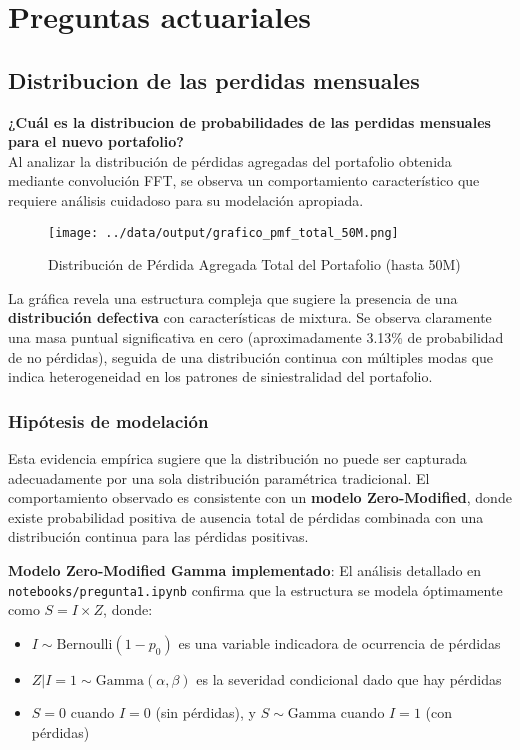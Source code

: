 \section{Preguntas actuariales}

\subsection{Distribucion de las perdidas mensuales}

\textbf{¿Cuál es la distribucion de probabilidades de las perdidas mensuales para el nuevo portafolio?}\\

Al analizar la distribución de pérdidas agregadas del portafolio obtenida mediante convolución FFT, se observa un comportamiento característico que requiere análisis cuidadoso para su modelación apropiada.

\begin{figure}[H]
\centering
\texttt{[image: ../data/output/grafico\_pmf\_total\_50M.png]}
\caption{Distribución de Pérdida Agregada Total del Portafolio (hasta 50M)}
\end{figure}

La gráfica revela una estructura compleja que sugiere la presencia de una \textbf{distribución defectiva} con características de mixtura. Se observa claramente una masa puntual significativa en cero (aproximadamente 3.13\% de probabilidad de no pérdidas), seguida de una distribución continua con múltiples modas que indica heterogeneidad en los patrones de siniestralidad del portafolio.

\subsubsection{Hipótesis de modelación}

Esta evidencia empírica sugiere que la distribución no puede ser capturada adecuadamente por una sola distribución paramétrica tradicional. El comportamiento observado es consistente con un \textbf{modelo Zero-Modified}, donde existe probabilidad positiva de ausencia total de pérdidas combinada con una distribución continua para las pérdidas positivas.

\textbf{Modelo Zero-Modified Gamma implementado}: El análisis detallado en \texttt{notebooks/pregunta1.ipynb} confirma que la estructura se modela óptimamente como $S = I \times Z$, donde:
\begin{itemize}
\item $I \sim \text{Bernoulli}(1-p_0)$ es una variable indicadora de ocurrencia de pérdidas
\item $Z | I=1 \sim \text{Gamma}(\alpha, \beta)$ es la severidad condicional dado que hay pérdidas
\item $S = 0$ cuando $I = 0$ (sin pérdidas), y $S \sim \text{Gamma}$ cuando $I = 1$ (con pérdidas)
\end{itemize}

